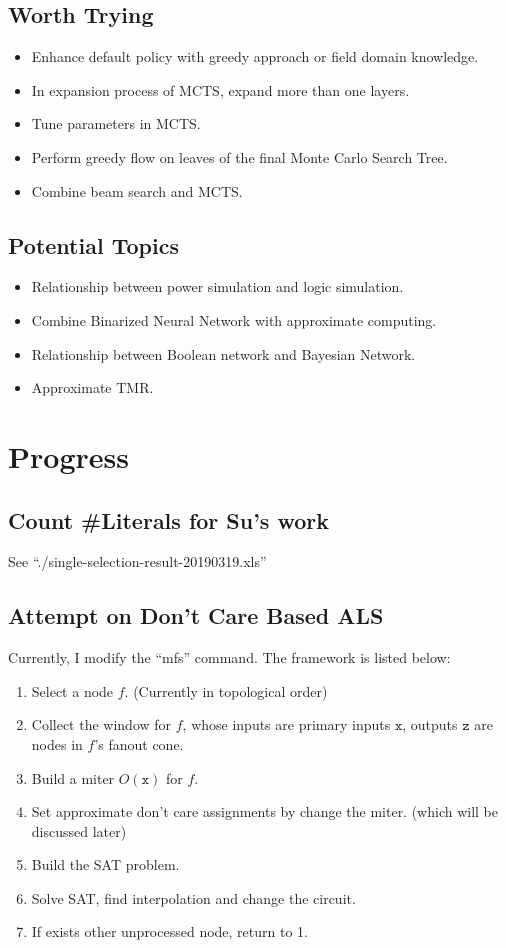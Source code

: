 \documentclass{article}
\begin{document}
\subsection{Worth Trying}
\begin{itemize}
    \item Enhance default policy with greedy approach or field domain knowledge.
    \item In expansion process of MCTS, expand more than one layers.
    \item Tune parameters in MCTS\@.
    \item Perform greedy flow on leaves of the final Monte Carlo Search Tree.
    \item Combine beam search and MCTS\@.
\end{itemize}

\subsection{Potential Topics}
\begin{itemize}
    \item Relationship between power simulation and logic simulation.
    \item Combine Binarized Neural Network with approximate computing.
    \item Relationship between Boolean network and Bayesian Network.
    \item Approximate TMR\@.
\end{itemize}

\section{Progress}
\subsection{Count \#Literals for Su's work}
See ``./single-selection-result-20190319.xls''

\subsection{Attempt on Don't Care Based ALS}
Currently,
I modify the ``mfs'' command.
The framework is listed below:
\begin{enumerate}
    \item Select a node $f$. (Currently in topological order)
    \item Collect the window for $f$,
        whose inputs are primary inputs $\mathtt x$,
        outputs $\mathtt z$ are nodes in $f$'s fanout cone.
    \item Build a miter $O(\mathtt x)$ for $f$.
    \item Set approximate don't care assignments by change the miter. (which will be discussed later)
    \item Build the SAT problem.
    \item Solve SAT, find interpolation and change the circuit.
    \item If exists other unprocessed node, return to 1.
\end{enumerate}
\end{document}
